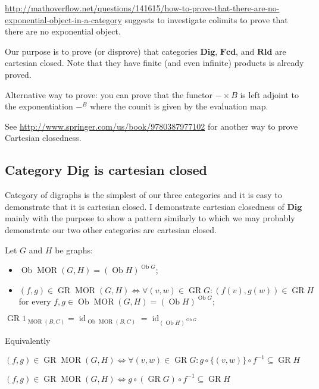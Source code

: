 \url{http://mathoverflow.net/questions/141615/how-to-prove-that-there-are-no-exponential-object-in-a-category}
suggests to investigate colimits to prove that there are no exponential
object.

Our purpose is to prove (or disprove) that categories $\mathbf{Dig}$, $\mathbf{Fcd}$, and $\mathbf{Rld}$ are cartesian closed. Note that they have finite (and even infinite) products is already proved.

Alternative way to prove:
you can prove that the functor $-\times B$ is left adjoint to the exponentiation $-^B$ where the counit is given by the evaluation map.

See \url{http://www.springer.com/us/book/9780387977102} for another way to prove Cartesian closedness.

\subsection{Category Dig is cartesian closed}

Category of digraphs is the simplest of our three categories and it is easy to demonstrate that it is cartesian closed. I demonstrate cartesian closedness of $\mathbf{Dig}$ mainly with the purpose to show a pattern similarly to which we may probably demonstrate our two other categories are cartesian closed.

Let $G$ and $H$ be graphs:
\begin{itemize}
\item $\operatorname{Ob} \operatorname{MOR} ( G , H) = ( \operatorname{Ob} H)^{\operatorname{Ob} G}$;
\item $( f , g) \in \operatorname{GR} \operatorname{MOR} ( G , H) \Leftrightarrow \forall ( v , w) \in \operatorname{GR} G : ( f ( v) , g ( w)) \in \operatorname{GR} H$ for every $f, g \in \operatorname{Ob} \operatorname{MOR} ( G , H) = ( \operatorname{Ob} H)^{\operatorname{Ob} G}$;
\end{itemize}

$\operatorname{GR} 1_{\operatorname{MOR} ( B , C)} = \operatorname{id}_{\operatorname{Ob} \operatorname{MOR} ( B , C)} = \operatorname{id}_{( \operatorname{Ob} H)^{\operatorname{Ob} G}}$

Equivalently

$( f , g) \in \operatorname{GR} \operatorname{MOR} ( G , H) \Leftrightarrow \forall ( v , w) \in \operatorname{GR} G : g \circ \{ ( v , w) \} \circ f^{- 1} \subseteq \operatorname{GR} H$

$( f , g) \in \operatorname{GR} \operatorname{MOR} ( G , H) \Leftrightarrow g \circ ( \operatorname{GR} G) \circ f^{- 1} \subseteq \operatorname{GR} H$

